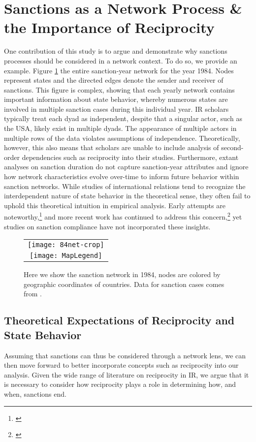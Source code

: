 \section*{Sanctions as a Network Process \& the Importance of Reciprocity}
\label{neteffects}

One contribution of this study is to argue and demonstrate why sanctions processes should be considered in a network context. To do so, we provide an example. Figure \ref{fig:spaghetti}  the entire sanction-year network for the year 1984.  Nodes represent states and the directed edges denote the sender and receiver of sanctions. This figure is complex, showing that each yearly network contains important information about state behavior, whereby numerous states are involved in multiple sanction cases during this individual year.  IR scholars typically treat each dyad as independent, despite that a singular actor, such as the USA, likely exist in multiple dyads. The appearance of multiple actors in multiple rows of the data violates assumptions of independence. Theoretically, however, this also means that scholars are unable to include analysis of second-order dependencies such as reciprocity into their studies. Furthermore, extant analyses on sanction duration do not capture sanction-year attributes and ignore how network characteristics evolve over-time to inform future behavior within sanction networks. While studies of international relations tend to recognize the interdependent nature of state behavior in the theoretical sense, they often fail to uphold this theoretical intuition in empirical analysis. Early attempts are noteworthy,\footnote{\cite{keohane1989reciprocity,goldstein1991reciprocity}} and more recent work has continued to address this concern,\footnote{\cite{mitchell2001,cranmer2014reciprocity}} yet studies on sanction compliance have not incorporated these insights. 

\begin{figure}[ht]
  \centering
  \begin{tabular}{c}
	  \texttt{[image: 84net-crop]} \\
	  \texttt{[image: MapLegend]}
  \end{tabular}
  \caption{Here we show the sanction network in 1984, nodes are colored by geographic coordinates of countries. Data for sanction cases comes from \citet{morgan2009threat}.}
  \label{fig:spaghetti}
\end{figure}
\FloatBarrier

\subsection{Theoretical Expectations of Reciprocity and State Behavior}
Assuming that sanctions can thus be considered through a network lens, we can then move forward to better incorporate concepts such as reciprocity into our analysis. Given the wide range of literature on reciprocity in IR, we argue that it is necessary to consider how reciprocity plays a role in determining how, and when, sanctions end.

